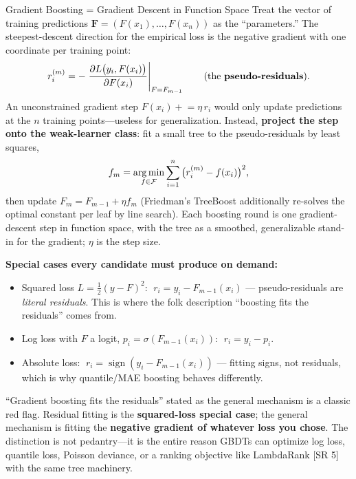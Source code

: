 \begin{mathresult}{Gradient Boosting = Gradient Descent in Function Space}
Treat the vector of training predictions $\bm{F} = (F(x_1), \ldots, F(x_n))$ as the ``parameters.'' The steepest-descent direction for the empirical loss is the negative gradient with one coordinate per training point:
\begin{equation}
r_i^{(m)} = -\left.\frac{\partial L\big(y_i, F(x_i)\big)}{\partial F(x_i)}\right|_{F = F_{m-1}} \qquad \text{(the \textbf{pseudo-residuals})}.
\end{equation}
An unconstrained gradient step $F(x_i) \mathrel{+}= \eta\, r_i$ would only update predictions at the $n$ training points---useless for generalization. Instead, \textbf{project the step onto the weak-learner class}: fit a small tree to the pseudo-residuals by least squares,
\begin{equation}
f_m = \operatorname*{arg\,min}_{f \in \mathcal{F}} \sum_{i=1}^n \big(r_i^{(m)} - f(x_i)\big)^2,
\end{equation}
then update $F_m = F_{m-1} + \eta f_m$ (Friedman's TreeBoost additionally re-solves the optimal constant per leaf by line search). Each boosting round is one gradient-descent step in function space, with the tree as a smoothed, generalizable stand-in for the gradient; $\eta$ is the step size.

\textbf{Special cases every candidate must produce on demand:}
\begin{itemize}
    \item Squared loss $L = \tfrac{1}{2}(y - F)^2$: $\;r_i = y_i - F_{m-1}(x_i)$ --- pseudo-residuals are \textit{literal residuals}. This is where the folk description ``boosting fits the residuals'' comes from.
    \item Log loss with $F$ a logit, $p_i = \sigma(F_{m-1}(x_i))$: $\;r_i = y_i - p_i$.
    \item Absolute loss: $\;r_i = \operatorname{sign}(y_i - F_{m-1}(x_i))$ --- fitting signs, not residuals, which is why quantile/MAE boosting behaves differently.
\end{itemize}
\end{mathresult}

\begin{warningbox}
``Gradient boosting fits the residuals'' stated as the general mechanism is a classic red flag. Residual fitting is the \textbf{squared-loss special case}; the general mechanism is fitting the \textbf{negative gradient of whatever loss you chose}. The distinction is not pedantry---it is the entire reason GBDTs can optimize log loss, quantile loss, Poisson deviance, or a ranking objective like LambdaRank [SR 5] with the same tree machinery.
\end{warningbox}

